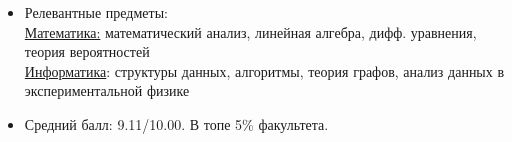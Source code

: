 \begin{itemize}
\item Релевантные предметы: \\
	\underline{Математика:} математический анализ, линейная алгебра, дифф. уравнения, теория вероятностей\\
	\underline{Информатика}: структуры данных, алгоритмы, теория графов, анализ данных в экспериментальной физике  \\
\item Средний балл: 9.11/10.00. В топе 5\% факультета.
\end{itemize}
